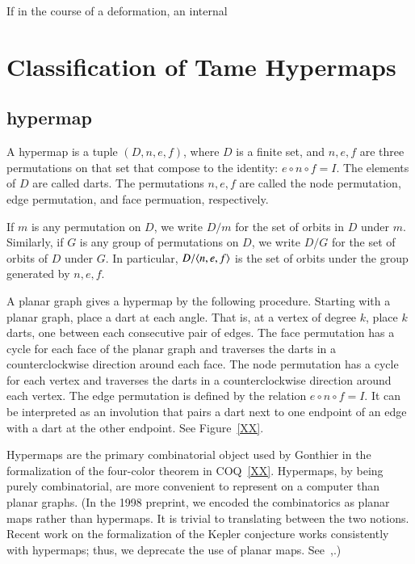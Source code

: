 If in the course of a deformation, an internal 










\section{Classification of Tame Hypermaps}

\subsection{hypermap}

A hypermap is a tuple $(D,n,e,f)$, where $D$ is a finite
set, and $n,e,f$ are three permutations on that set that
compose to the identity:
$e\circ n\circ f = I$.  The elements of $D$ are called darts.
The permutations $n,e,f$ are called the node permutation,
edge permutation, and face permuation, respectively.

If $m$ is any permutation on $D$, we write $D/m$ for the
set of orbits in $D$ under $m$.  Similarly, if $G$ is any
group of permutations on $D$, we write $D/G$ for the set
of orbits of $D$ under $G$.  In particular, $D/\langle n,e,f\rangle$
is the set of orbits under the group generated by $n,e,f$.

A planar graph gives  a hypermap
by the following procedure.  Starting with a planar graph,
place a dart at each angle.  That is, at a vertex of degree $k$,
place $k$ darts, one between each consecutive pair of edges.
The face permutation has a cycle for
each face of the planar graph and  traverses the
darts in a counterclockwise direction around each face.
The node permutation has a cycle for each vertex and traverses
the darts in a counterclockwise direction around each vertex.
The edge permutation is defined by the relation $e\circ n\circ f=I$.
It can be interpreted as an involution that pairs a dart next
to one endpoint of an edge with a dart at the other endpoint.
See Figure~\ref{XX}.

Hypermaps are the primary combinatorial object used by Gonthier
in the formalization of the four-color theorem in COQ~\ref{XX}.
Hypermaps, by being purely combinatorial, are more convenient
to represent on a computer than planar graphs.  (In the 1998
preprint, we encoded the combinatorics as planar maps rather
than hypermaps.  It is trivial to translating between the two notions.
Recent work on the formalization of the Kepler conjecture works
consistently with hypermaps; thus, we deprecate the use of
planar maps.  See~\cite{XXObua},\cite{XXBlue}.)


